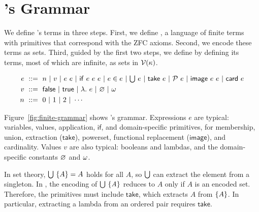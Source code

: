 \begin{comment}
rank(A x B) = max(rank(A),rank(B)) + 2
rank(A -> B) = max(rank(A),rank(B)) + 3
rank(quotient A) = rank(A) + 1

rank(Z) = omega + 2 + 1
rank(Q) = rank(Z) + 2 + 1
rank(R) = rank(Q) + 3 + 1
\end{comment}

\section{\targetlang's Grammar}

We define \targetlang's terms in three steps. First, we define \ftargetlang, a language of finite terms with primitives that correspond with the ZFC axioms. Second, we encode these terms as sets. Third, guided by the first two steps, we define \targetlang by defining its terms, most of which are infinite, as sets in $\mathcal{V}(\kappa)$.

\begin{figure*}[tb]\centering
\begin{equation*}
\begin{aligned}
	e \ &::=\ n \ |\  v \ |\  e\ e \ |\  {\mathsf{if}}\ {e}\ {e}\ {e} \ |\  e \in e
	  \ |\  {\textstyle\textstyle\bigcup}\ {e} \ |\  {\mathsf{take}}\ {e} \ |\  \mathcal{P}\ {e} \ |\  {\mathsf{image}}\ {e}\ {e} \ |\  {\mathsf{card}}\ {e} \\
	v \ &::=\ \mathsf{false} \ |\  \mathsf{true} \ |\  \lambda\ldotp\,{e} \ |\  \varnothing \ |\  \omega \\
	n \ &::=\ 0 \ |\  1 \ |\  2 \ |\  \cdots
\end{aligned}
\end{equation*}
\bottomhrule
\caption[Definition of \ftargetlang]{The definition of \ftargetlang, which represents countably many \targetlang terms.}
\label{fig:finite-grammar}
\end{figure*}

Figure~\ref{fig:finite-grammar} shows \ftargetlang's grammar. Expressions $e$ are typical: variables, values, application, $\mathsf{if}$, and domain-specific primitives, for membership, union, extraction ($\mathsf{take}$), powerset, functional replacement ($\mathsf{image}$), and cardinality. Values $v$ are also typical: booleans and lambdas, and the domain-specific constants $\varnothing$ and $\omega$.

In set theory, $\textstyle\bigcup\ \{{A}\} = A$ holds for all $A$, so $\textstyle\bigcup$ can extract the element from a singleton. In \targetlang, the encoding of $\U\ \set{\mathit{A}}$ reduces to $A$ only if $A$ is an encoded set. Therefore, the primitives must include $\mathsf{take}$, which extracts $A$ from $\{{A}\}$. In particular, extracting a lambda from an ordered pair requires $\mathsf{take}$.

